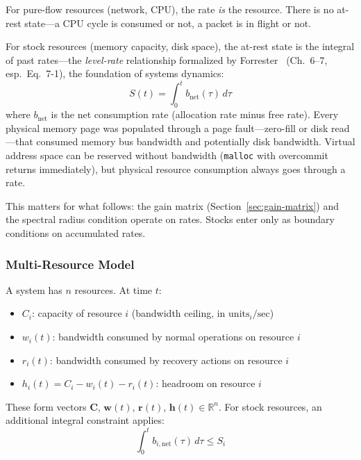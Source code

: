 \documentclass[11pt]{article}
\begin{document}
For pure-flow resources (network, CPU), the rate \emph{is} the resource. There
is no at-rest state---a CPU cycle is consumed or not, a packet is in flight or
not.

For stock resources (memory capacity, disk space), the at-rest state is the
integral of past rates---the \emph{level-rate} relationship formalized by
Forrester~\cite{forrester1961industrial} (Ch.~6--7, esp.\ Eq.~7-1), the
foundation of systems dynamics:
\begin{equation}
  S(t) = \int_0^t b_{\mathrm{net}}(\tau)\,d\tau
\end{equation}
where $b_{\mathrm{net}}$ is the net consumption rate (allocation rate minus free
rate). Every physical memory page was populated through a page fault---zero-fill
or disk read---that consumed memory bus bandwidth and potentially disk bandwidth.
Virtual address space can be reserved without bandwidth (\texttt{malloc} with
overcommit returns immediately), but physical resource consumption always goes
through a rate.

This matters for what follows: the gain matrix (Section~\ref{sec:gain-matrix})
and the spectral radius condition operate on rates. Stocks enter only as boundary
conditions on accumulated rates.

\subsubsection{Multi-Resource Model}
\label{sec:multi-resource}

A system has $n$ resources. At time $t$:

\begin{itemize}[nosep]
  \item $C_i$: capacity of resource $i$ (bandwidth ceiling, in
    $\mathrm{units}_i/\mathrm{sec}$)
  \item $w_i(t)$: bandwidth consumed by normal operations on resource $i$
  \item $r_i(t)$: bandwidth consumed by recovery actions on resource $i$
  \item $h_i(t) = C_i - w_i(t) - r_i(t)$: headroom on resource $i$
\end{itemize}

These form vectors $\mathbf{C}$, $\mathbf{w}(t)$, $\mathbf{r}(t)$,
$\mathbf{h}(t) \in \mathbb{R}^n$. For stock resources, an additional integral
constraint applies:
\begin{equation}
  \int_0^t b_{i,\mathrm{net}}(\tau)\,d\tau \leq S_i
\end{equation}
\end{document}
